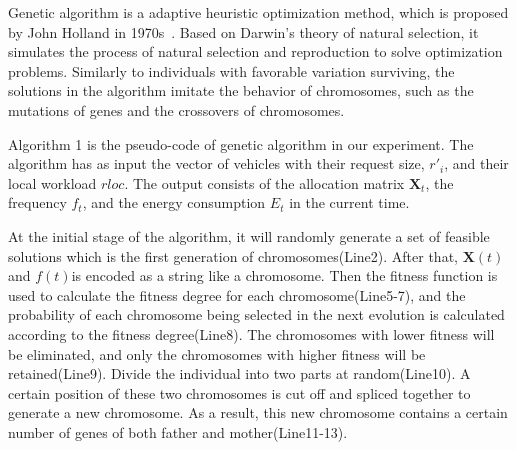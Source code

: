 \documentclass[conference]{IEEEtran}
\begin{document}
	Genetic algorithm is a adaptive heuristic optimization method, which is proposed by John Holland in 1970s~\cite{gafirst}. Based on Darwin's theory of natural selection, it simulates the process of natural selection and reproduction to solve optimization problems. 
	Similarly to individuals with favorable variation surviving, the solutions in the algorithm imitate the behavior of chromosomes, such as the mutations of genes and the crossovers of chromosomes. 
	
	
	Algorithm 1 is the pseudo-code of genetic algorithm in our experiment. The algorithm has as input the vector of vehicles with their request size, $r'_i$, and their local workload $rloc $. The output consists of the allocation matrix $ \mathbf{X}_t$, the frequency $f_t$, and the energy consumption $E_t$ in the current time. 
	
	At the initial stage of the algorithm, it will randomly generate a set of feasible solutions which is the first generation of chromosomes(Line2). 
	After that, $\mathbf{X}(t) $ and $ f(t)$is encoded as a string like a chromosome. 
	Then the fitness function is used to calculate the fitness degree for each chromosome(Line5-7), and the probability of each chromosome being selected in the next evolution is calculated according to the fitness degree(Line8). The chromosomes with lower fitness will be eliminated, and only the chromosomes with higher fitness will be retained(Line9). 
	Divide the individual into two parts at random(Line10). 
	A certain position of these two chromosomes is cut off and spliced together to generate a new chromosome. As a result, this new chromosome contains a certain number of genes of both father and mother(Line11-13). 
	
\end{document}
